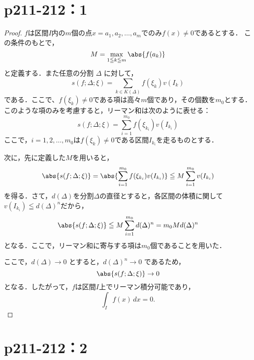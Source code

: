 \documentclass[a4paper,10pt,fleqn]{ltjsarticle}
\begin{document}
\section*{p211-212：1}


\begin{tleftbar}
    \begin{proof}
        $f$は区間$I$内の$m$個の点$x = a_1, a_2, \ldots, a_m$でのみ$f(x) \ne 0$であるとする．
        この条件のもとで，
        \[
            M = \max_{1 \leqq k \leqq m} \abs{f(a_k)}
        \]
        と定義する．また任意の分割 $\Delta$ に対して，
        \[
            s(f; \Delta; \xi) = \sum_{k \in K(\Delta)} f(\xi_k) v(I_k)
        \]
        である．ここで、$f(\xi_k) \ne 0$である項は高々$m$個であり，その個数を$m_0$とする．
        このような項のみを考慮すると，リーマン和は次のように表せる：
        \[
            s(f; \Delta; \xi) = \sum_{i=1}^{m_0} f(\xi_{k_i}) v(I_{k_i})
        \]
        ここで，$i = 1, 2, \ldots, m_0$は$f(\xi_k) \ne 0$である区間$ I_{k_i} $を走るものとする．

        次に，先に定義した$M$を用いると，
        \[
            \abs{s(f; \Delta; \xi)} = \abs{\sum_{i=1}^{m_0} f(\xi_{k_i}) v(I_{k_i})} \leqq M \sum_{i=1}^{m_0} v(I_{k_i})
        \]
        を得る．さて，$d(\Delta)$を分割$\Delta$の直径とすると，各区間の体積に関して$ v(I_{k_i}) \leqq d(\Delta)^n $だから，
        \[
            \abs{s(f; \Delta; \xi)} \leqq M \sum_{i=1}^{m_0} d(\Delta)^n = m_0 M d(\Delta)^n
        \]
        となる．ここで，リーマン和に寄与する項は$m_0$個であることを用いた．

        ここで，$d(\Delta) \to 0$ とすると，$d(\Delta)^n \to 0$ であるため，
        \[
            \abs{s(f; \Delta; \xi)} \to 0
        \]
        となる．したがって，$f$は区間$I$上でリーマン積分可能であり，
        \[
            \int_{I} f(x)\, dx = 0.
        \]
    \end{proof}
\end{tleftbar}

\section*{p211-212：2}
\end{document}
